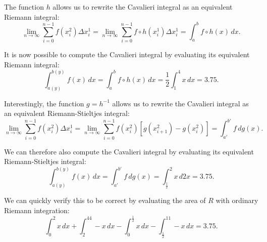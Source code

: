 \documentclass{article}
\theoremstyle{theorem}
\theoremstyle{definition}
\begin{document}
\noindent
The function $h$ allows us to rewrite the Cavalieri integral as an equivalent Riemann integral:
\begin{equation}
\label{eq:h_int}
\lim_{n\to \infty}\sum_{i=0}^{n-1} f(x_i^2)\Delta x_i^1 =  \lim_{n\to \infty}\sum_{i=0}^{n-1} f \circ h (x_i^1)\Delta x_i^1 = \int_a^b f \circ h (x)\, dx.
\end{equation}

\noindent
It is now possible to compute the Cavalieri integral by evaluating its equivalent Riemann integral:
\begin{equation}
\int_{a(y)}^{b(y)}f(x)\, dx = \int_a^b f \circ h (x)\, dx = \dfrac{1}{2}\int_1^4x\, dx = 3.75.  
\end{equation}

\noindent
Interestingly, the function $g=h^{-1}$ allows us to rewrite the Cavalieri integral as an equivalent Riemann-Stieltjes integral:
\begin{equation}
\label{eq:g_int}
\lim_{n\to \infty}\sum_{i=0}^{n-1} f(x_i^2)\Delta x_i^1 =  \lim_{n\to \infty} \sum_{i=0}^{n-1} f(x_i^2)[g(x_{i+1}^2)-g(x_{i}^2)] = \int_{a'}^{b'} f \, dg(x). 
\end{equation}

\noindent
We can therefore also compute the Cavalieri integral by evaluating its equivalent Riemann-Stieltjes integral:
\begin{equation}
\int_{a(y)}^{b(y)}f(x)\, dx = \int_{a'}^{b'} f \, dg(x) = \int_{\frac{1}{2}}^2x\, d2x = 3.75.  
\end{equation}

\noindent
We can quickly verify this to be correct by evaluating the area of $R$ with ordinary Riemann integration:
\begin{equation}
\int_0^2x\, dx+\int_2^44-x\, dx- \int_0^{\frac{1}{2}}x\, dx-\int_{\frac{1}{2}}^11-x\, dx = 3.75. 
\end{equation}

\end{document}

